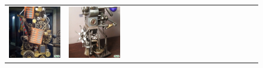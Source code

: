 \begin{figure}[ht!]
\begin{adjustwidth}{-0.8in}{-0.5in}
\begin{tabular}{cccccccccccccccccccc}
\multicolumn{2}{c}{\includegraphics[width=\threebythreecolwidth\textwidth]{figures/cherries/metal2.jpg}} &
\multicolumn{2}{c}{\includegraphics[width=\threebythreecolwidth\textwidth]{figures/cherries/metal3.jpg}} &&

\end{tabular}
\end{adjustwidth}
\end{figure}
